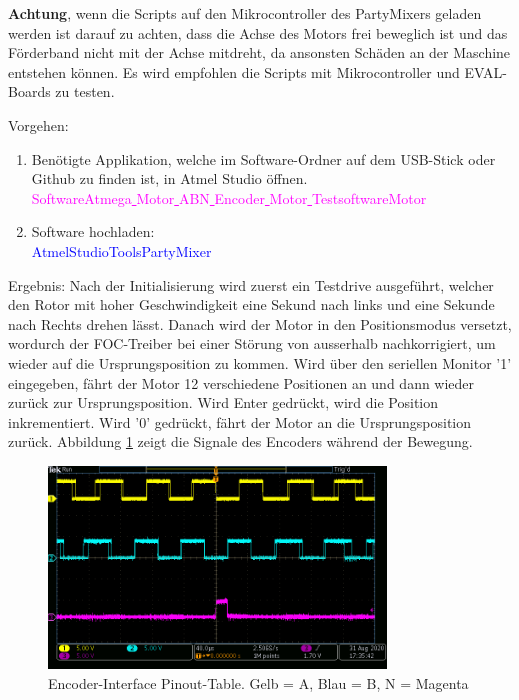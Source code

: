 \textbf{Achtung}, wenn die Scripts auf den Mikrocontroller des PartyMixers geladen werden ist darauf zu achten, dass die Achse des Motors frei beweglich ist und das Förderband nicht mit der Achse mitdreht, da ansonsten Schäden an der Maschine entstehen können. Es wird empfohlen die Scripts mit Mikrocontroller und EVAL-Boards zu testen.

Vorgehen:
\begin{enumerate}
\item Benötigte Applikation, welche im Software-Ordner auf dem USB-Stick oder Github \cite{aebi_projekt-6softwareatmega_2020} zu finden ist, in Atmel Studio öffnen.\\
\textcolor{magenta}{Software\textrightarrow Atmega\underline{ }Motor\underline{ }ABN\underline{ }Encoder\underline{ }Motor\underline{ }Testsoftware\textrightarrow Motor}\\

\item Software hochladen:\\
\textcolor{blue}{AtmelStudio\textrightarrow Tools\textrightarrow PartyMixer}\\


\end{enumerate}

Ergebnis: Nach der Initialisierung wird zuerst ein Testdrive ausgeführt, welcher den Rotor mit hoher Geschwindigkeit eine Sekund nach links und eine Sekunde nach Rechts drehen lässt. Danach wird der Motor in den Positionsmodus versetzt, wordurch der FOC-Treiber bei einer Störung von ausserhalb nachkorrigiert, um wieder auf die Ursprungsposition zu kommen. Wird über den seriellen Monitor '1' eingegeben, fährt der Motor 12 verschiedene Positionen an und dann wieder zurück zur Ursprungsposition. Wird Enter gedrückt, wird die Position inkrementiert. Wird '0' gedrückt, fährt der Motor an die Ursprungsposition zurück. Abbildung \ref{fig:AMT322S-V_Signal} zeigt die Signale des Encoders während der Bewegung.

\begin{figure}[H]
	\centering
	\includegraphics[width=0.8\textwidth]{graphics/AMT322S-V_Signal}
	\caption{Encoder-Interface Pinout-Table. Gelb = A, Blau = B, N = Magenta}
	\label{fig:AMT322S-V_Signal}
\end{figure}

